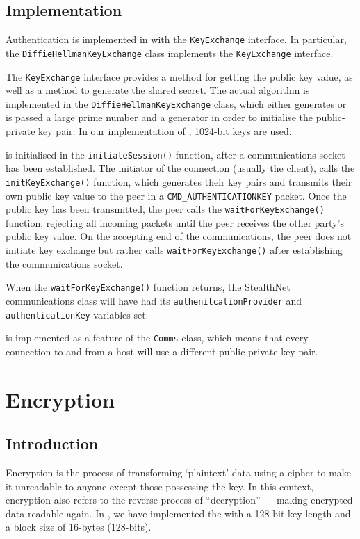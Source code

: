 \documentclass[a4paper,11pt]{article}
\begin{document}
\subsection{Implementation}
Authentication is implemented in \packageName{} with the 
\verb+KeyExchange+ interface. In particular, the \verb+DiffieHellmanKeyExchange+
class implements the \verb+KeyExchange+ interface.

The \verb+KeyExchange+ interface provides a method for getting the public key
value, as well as a method to generate the shared secret. The actual 
 algorithm is implemented in the 
\verb+DiffieHellmanKeyExchange+ class, which either generates or is passed a 
large prime number and a generator in order to initialise the 
 public-private key pair. In our implementation of 
, 1024-bit keys are used.

 is initialised in the 
\verb+initiateSession()+ function, after a communications socket has been 
established. The initiator of the connection (usually the client), calls the
\verb+initKeyExchange()+ function, which generates their 
 key pairs and transmits their own public key value to
the peer in a \verb+CMD_AUTHENTICATIONKEY+ packet. Once the public key has been 
transmitted, the \serviceName{} peer calls the \verb+waitForKeyExchange()+ 
function, rejecting all incoming packets until the peer receives the other
party's public key value. On the accepting end of the communications, the peer
does not initiate key exchange but rather calls \verb+waitForKeyExchange()+ 
after establishing the communications socket.

When the \verb+waitForKeyExchange()+ function returns, the StealthNet 
communications class will have had its \verb+authenitcationProvider+ and \\
\verb+authenticationKey+ variables set.

 is implemented as a feature of the
\serviceName{} \verb+Comms+ class, which means that every connection to and from
a host will use a different public-private key pair.
 
\section{Encryption}

\subsection{Introduction}
Encryption is the process of transforming `plaintext' data using a cipher to 
make it unreadable to anyone except those possessing the key. In this context,
encryption also refers to the reverse process of ``decryption'' --- making
encrypted data readable again. In \packageName{}, we have implemented the
 with a 128-bit key length and a 
block size of 16-bytes (128-bits).
\end{document}
